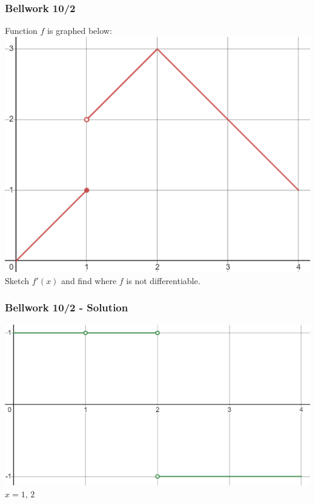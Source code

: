 \documentclass[12pt]{beamer}
\begin{document}
\begin{frame}
	\frametitle{Bellwork 10/2}
	\initclock

	\begin{center}
		\vfill
		Function $f$ is graphed below:
		\vfill
		\includegraphics[scale=0.5]{bellwork_graph.png}
		\vfill
		Sketch $f'(x)$ and find where $f$ is not differentiable.
		\vfill
	\end{center}

	\small
	\crono
\end{frame}
\begin{frame}
	\frametitle{Bellwork 10/2 - Solution}

	\begin{center}
		\includegraphics[scale=0.6]{bellwork_solution_graph.png}
		\vfill
		$\boxed{x=1\text{, }2}$
	\end{center}
\end{frame}
\end{document}
